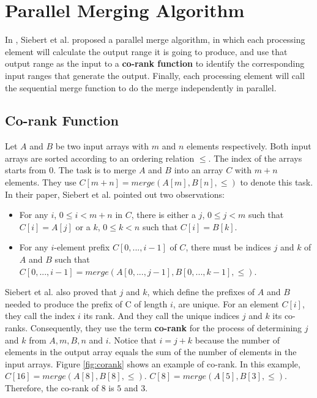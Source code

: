 \chapter{Parallel Merging Algorithm}\label{chap:algo}

In \cite{pmalgo}, Siebert et al. proposed a parallel merge algorithm,
in which each processing element will calculate the output range it is
going to produce, and 
use that output range as the input to a \textbf{co-rank function} to identify the corresponding input
ranges that generate the output. Finally, each processing element will call the sequential merge
function to do the merge independently in parallel.

    \section{Co-rank Function}\label{sect:corank}
    Let $A$ and $B$ be two input arrays with $m$ and $n$ elements respectively. Both input arrays 
    are sorted 
    according to an ordering relation $\leq$. The index of the arrays starts from $0$. 
    The task is to merge $A$ and $B$ into an array $C$ with $m+n$ elements. 
    They use $C[m+n] = merge(A[m],B[n],\leq)$ to denote this task.
    In their paper, Siebert et al. pointed out two observations:
    \begin{itemize} 
        \item   For any $i$, $0 \leq i < m+n$ in $C$, there is either a $j$, $0 \leq j < m$ such that 
                $C[i] = A[j]$ or a $k$, $0 \leq k < n$ such that $C[i] = B[k]$. 
        \item   For any $i$-element prefix $C[0,...,i-1]$ of $C$, there must be indices $j$ 
                and $k$ of $A$ and $B$ such that $C[0,...,i-1] = merge(A[0,...,j-1],
                B[0,...,k-1],\leq)$.
    \end{itemize}
    Siebert et al. also proved that $j$ and $k$, which define
    the prefixes of $A$ and $B$ needed to produce the prefix of C of length $i$, are unique. 
    For an element $C[i]$, they call the index $i$ its rank. And they call the unique indices $j$ and $k$ 
    its co-ranks. Consequently, 
    they use the term \textbf{co-rank} for the process of determining $j$ and $k$ from $A, m, B, n$ and $i$.
    Notice that $i = j + k$ because the number of elements in the output array equals the sum of the number of elements
    in the input arrays. 
    Figure \ref{fig:corank} shows an example of co-rank. In this example, $C[16] = merge(A[8],B[8],\leq)$.
    $C[8] = merge(A[5],B[3],\leq)$. Therefore, the co-rank of $8$ is $5$ and $3$.  

